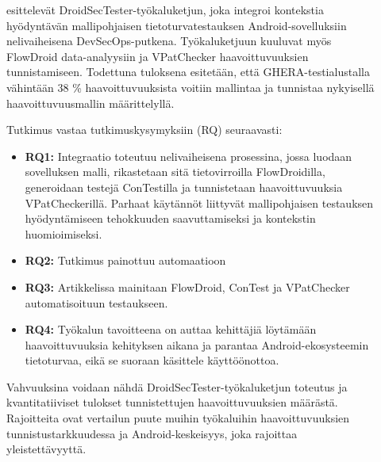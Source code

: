 \documentclass[bscthesis,finnish,oneside,biblatex]{uefcsthesis}
\begin{document}
\begin{description}
    \item[\cite{baheux2023_droidsectester}] esittelevät DroidSecTester-työkaluketjun, joka integroi kontekstia hyödyntävän mallipohjaisen tietoturvatestauksen Android-sovelluksiin nelivaiheisena DevSecOps-putkena. Työkaluketjuun kuuluvat myös FlowDroid data-analyysiin ja VPatChecker haavoittuvuuksien tunnistamiseen. Todettuna tuloksena esitetään, että GHERA-testialustalla vähintään 38 \% haavoittuvuuksista voitiin mallintaa ja tunnistaa nykyisellä haavoittuvuusmallin määrittelyllä.

    Tutkimus vastaa tutkimuskysymyksiin (RQ) seuraavasti:
    \begin{itemize}
        \item \textbf{RQ1:} Integraatio toteutuu nelivaiheisena prosessina, jossa luodaan sovelluksen malli, rikastetaan sitä tietovirroilla FlowDroidilla, generoidaan testejä ConTestilla ja tunnistetaan haavoittuvuuksia VPatCheckerillä. Parhaat käytännöt liittyvät mallipohjaisen testauksen hyödyntämiseen tehokkuuden saavuttamiseksi ja kontekstin huomioimiseksi.
        \item \textbf{RQ2:} Tutkimus painottuu automaatioon
        \item \textbf{RQ3:} Artikkelissa mainitaan FlowDroid, ConTest ja VPatChecker automatisoituun testaukseen.
        \item \textbf{RQ4:} Työkalun tavoitteena on auttaa kehittäjiä löytämään haavoittuvuuksia kehityksen aikana ja parantaa Android-ekosysteemin tietoturvaa, eikä se suoraan käsittele käyttöönottoa.
    \end{itemize}

     Vahvuuksina voidaan nähdä DroidSecTester-työkaluketjun toteutus ja kvantitatiiviset tulokset tunnistettujen haavoittuvuuksien määrästä. Rajoitteita ovat vertailun puute muihin työkaluihin haavoittuvuuksien tunnistustarkkuudessa ja Android-keskeisyys, joka rajoittaa yleistettävyyttä.
\end{description}
\end{document}
